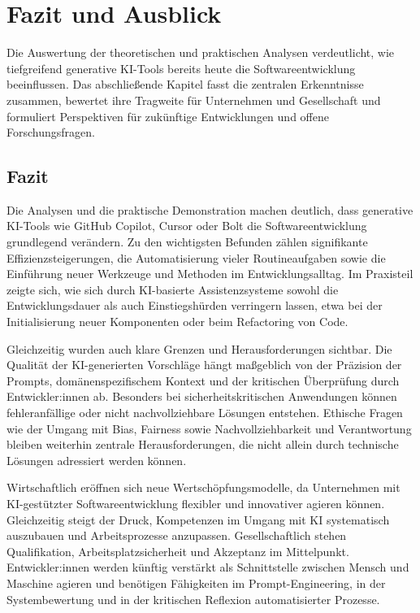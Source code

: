 \chapter{Fazit und Ausblick}
Die Auswertung der theoretischen und praktischen Analysen verdeutlicht, wie
tiefgreifend generative KI-Tools bereits heute die Softwareentwicklung
beeinflussen. Das abschließende Kapitel fasst die zentralen Erkenntnisse
zusammen, bewertet ihre Tragweite für Unternehmen und Gesellschaft und
formuliert Perspektiven für zukünftige Entwicklungen und offene
Forschungsfragen.

\section{Fazit}
Die Analysen und die praktische Demonstration machen deutlich, dass generative
KI-Tools wie GitHub Copilot, Cursor oder Bolt die Softwareentwicklung
grundlegend verändern. Zu den wichtigsten Befunden zählen signifikante
Effizienzsteigerungen, die Automatisierung vieler Routineaufgaben sowie die
Einführung neuer Werkzeuge und Methoden im Entwicklungsalltag. Im Praxisteil
zeigte sich, wie sich durch KI-basierte Assistenzsysteme sowohl die
Entwicklungsdauer als auch Einstiegshürden verringern lassen, etwa bei der
Initialisierung neuer Komponenten oder beim Refactoring von Code.

Gleichzeitig wurden auch klare Grenzen und Herausforderungen sichtbar. Die
Qualität der KI-generierten Vorschläge hängt maßgeblich von der Präzision der
Prompts, domänenspezifischem Kontext und der kritischen Überprüfung durch
Entwickler:innen ab. Besonders bei sicherheitskritischen Anwendungen können
fehleranfällige oder nicht nachvollziehbare Lösungen entstehen. Ethische Fragen
wie der Umgang mit Bias, Fairness sowie Nachvollziehbarkeit und Verantwortung
bleiben weiterhin zentrale Herausforderungen, die nicht allein durch technische
Lösungen adressiert werden können.

Wirtschaftlich eröffnen sich neue Wertschöpfungsmodelle, da Unternehmen mit
KI-gestützter Softwareentwicklung flexibler und innovativer agieren können.
Gleichzeitig steigt der Druck, Kompetenzen im Umgang mit KI systematisch
auszubauen und Arbeitsprozesse anzupassen. Gesellschaftlich stehen
Qualifikation, Arbeitsplatzsicherheit und Akzeptanz im Mittelpunkt.
Entwickler:innen werden künftig verstärkt als Schnittstelle zwischen Mensch und
Maschine agieren und benötigen Fähigkeiten im Prompt-Engineering, in der
Systembewertung und in der kritischen Reflexion automatisierter Prozesse.

